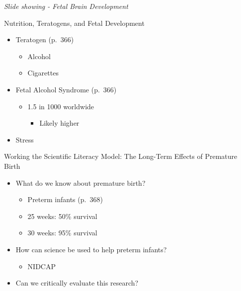 \documentclass[
]{book}
\providecommand{\tightlist}{%
  \setlength{\itemsep}{0pt}\setlength{\parskip}{0pt}}
\begin{document}
\begin{reflect}
\emph{Slide showing - Fetal Brain Development}

Nutrition, Teratogens, and Fetal Development

\begin{itemize}
\tightlist
\item
  Teratogen (p.~366)

  \begin{itemize}
  \tightlist
  \item
    Alcohol\\
  \item
    Cigarettes\\
  \end{itemize}
\item
  Fetal Alcohol Syndrome (p.~366)

  \begin{itemize}
  \tightlist
  \item
    1.5 in 1000 worldwide

    \begin{itemize}
    \tightlist
    \item
      Likely higher\\
    \end{itemize}
  \end{itemize}
\item
  Stress
\end{itemize}

Working the Scientific Literacy Model: The Long-Term Effects of Premature Birth

\begin{itemize}
\tightlist
\item
  What do we know about premature birth?

  \begin{itemize}
  \tightlist
  \item
    Preterm infants (p.~368)\\
  \item
    25 weeks: 50\% survival\\
  \item
    30 weeks: 95\% survival\\
  \end{itemize}
\item
  How can science be used to help preterm infants?

  \begin{itemize}
  \tightlist
  \item
    NIDCAP\\
  \end{itemize}
\item
  Can we critically evaluate this research?


\end{itemize}
\end{reflect}
\end{document}
